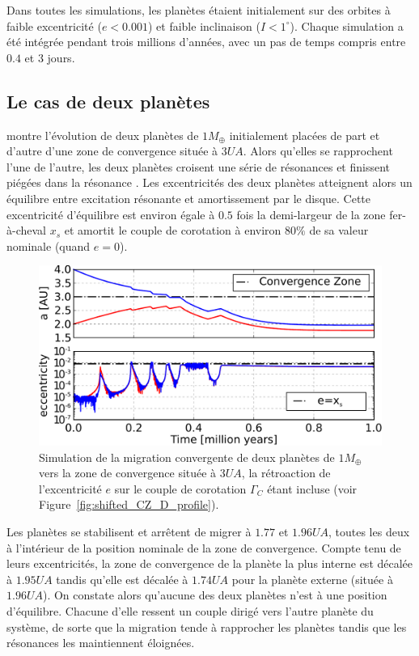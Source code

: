 \bigskip

Dans toutes les simulations, les planètes étaient initialement sur des orbites à faible excentricité ($e<0.001$) et faible inclinaison ($I<1^\circ$). Chaque simulation a été intégrée pendant trois millions d'années, avec un pas de temps compris entre $0.4$ et $3$ jours.

\subsection{Le cas de deux planètes}
 montre l'évolution de deux planètes de $1\unit{M_\oplus}$ initialement placées de part et d'autre d'une zone de convergence située à $3\unit{UA}$. Alors qu'elles se rapprochent l'une de l'autre, les deux planètes croisent une série de résonances et finissent piégées dans la résonance . Les excentricités des deux planètes atteignent alors un équilibre entre excitation résonante et amortissement par le disque. Cette excentricité d'équilibre est environ égale à $0.5$ fois la demi-largeur de la zone fer-à-cheval $x_s$ et amortit le couple de corotation à environ $80\%$ de sa valeur nominale (quand $e=0$). 

\begin{figure}[htbp]
\centering
\includegraphics[width=\linewidth]{figure/shifted/corotation_damping_influence.pdf}
\caption[Effet de l'amortissement du couple de corotation dans un cas à deux planètes.]{Simulation de la migration convergente
de deux planètes de $1\unit{M_\oplus}$ vers la zone de convergence située à $3\unit{UA}$, la rétroaction de l'excentricité $e$
sur le couple de corotation $\Gamma_C$ étant incluse (voir Figure~\ref{fig:shifted_CZ_D_profile}).}
\label{fig:two-planets}
\end{figure}

Les planètes se stabilisent et arrêtent de migrer à $1.77$ et $1.96\unit{UA}$, toutes les deux à l'intérieur de la position nominale de la zone de convergence. Compte tenu de leurs excentricités, la zone de convergence de la planète la plus interne est décalée à $1.95\unit{UA}$ tandis qu'elle est décalée à $1.74\unit{UA}$ pour la planète externe (située à $1.96\unit{UA}$). On constate alors qu'aucune des deux planètes n'est à une position d'équilibre. Chacune d'elle ressent un couple dirigé vers l'autre planète du système, de sorte que la migration tende à rapprocher les planètes tandis que les résonances les maintiennent éloignées.

